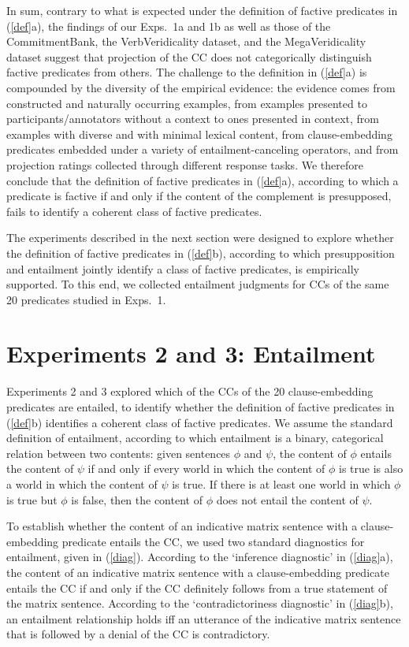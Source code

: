 \documentclass[11pt,fleqn]{article}
\newcommand{\6}{\mbox{$[\hspace*{-.6mm}[$}}
\newcommand{\9}{\mbox{$]\hspace*{-.6mm}]$}}
\begin{document}
In sum, contrary to what is expected under the definition of factive predicates in (\ref{def}a), the findings of our Exps.~1a and 1b as well as those of the CommitmentBank, the VerbVeridicality dataset, and the MegaVeridicality dataset suggest that projection of the CC does not categorically distinguish factive predicates from others. The challenge to the definition in (\ref{def}a) is compounded by the diversity of the empirical evidence: the evidence comes from constructed and naturally occurring examples, from examples presented to participants/annotators without a context to ones presented in context, from examples with diverse and with minimal lexical content, from clause-embedding predicates embedded under a variety of entailment-canceling operators, and from projection ratings collected through different response tasks. We therefore conclude that the definition of factive predicates in (\ref{def}a), according to which a predicate is factive if and only if the content of the complement is presupposed, fails to identify a coherent class of factive predicates. 

The experiments described in the next section were designed to explore whether the definition of factive predicates in (\ref{def}b), according to which presupposition and entailment jointly identify a class of factive predicates, is empirically supported. To this end, we collected entailment judgments for CCs of the same 20 predicates studied in Exps.~1.

\section{Experiments 2 and 3: Entailment}\label{s3}

Experiments 2 and 3 explored which of the CCs of the 20 clause-embedding predicates are entailed, to identify whether the definition of factive predicates in (\ref{def}b) identifies a coherent class of factive predicates. We assume the standard definition of entailment, according to which entailment is a binary, categorical relation between two contents: given sentences $\phi$ and $\psi$, the content of $\phi$ entails the content of $\psi$ if and only if every world in which the content of $\phi$ is true is also a world in which the content of $\psi$ is true. If there is at least one world in which $\phi$ is true but $\phi$ is false, then the content of $\phi$ does not entail the content of $\psi$. 

To establish whether the content of an indicative matrix sentence with a clause-embedding predicate entails the CC, we used two standard diagnostics for entailment, given in (\ref{diag}). According to the `inference diagnostic' in (\ref{diag}a), the content of an indicative matrix sentence with a clause-embedding predicate entails the CC if and only if the CC definitely follows from a true statement of the matrix sentence. According to the `contradictoriness diagnostic' in (\ref{diag}b), an entailment relationship holds iff an utterance of the indicative matrix sentence that is followed by a denial of the CC is contradictory. 
\end{document}
